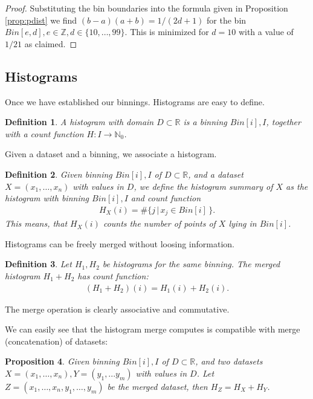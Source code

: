 \documentclass{article}
\theoremstyle{plain}
\newtheorem{definition}{Definition}[section]
\newtheorem{proposition}[definition]{Proposition}
\theoremstyle{remark}
\newcommand{\IN}{\mathbb{N}}
\newcommand{\IR}{\mathbb{R}}
\newcommand{\IZ}{\mathbb{Z}}
\newcommand{\ra}{\rightarrow}
\begin{document}
\begin{proof}
  Substituting the bin boundaries into the formula given in Proposition \ref{prop:pdist} we find
  $(b - a)(a + b) = 1/(2d + 1)$ for the bin $Bin[e,d], e \in \IZ, d \in \{ 10, \dots, 99 \}$.
  This is minimized for $d = 10$ with a value of $1/21$ as claimed.
\end{proof}

\subsection{Histograms}

Once we have established our binnings. Histograms are easy to define.

\begin{definition}\label{def:hist}
  A histogram with domain $D \subset \IR$ is a binning $Bin[i],I$, together with a count function $H: I \ra \IN_{0}$.
\end{definition}

Given a dataset and a binning, we associate a histogram.

\begin{definition}
  Given binning $Bin[i],I$ of $D \subset \IR$, and a dataset $X = (x_1,\dots,x_n)$ with values in
  $D$, we define the histogram summary of $X$ as the histogram with binning $Bin[i],I$ and count
  function
  \begin{align*}
    H_X(i) = \# \{ j \, | \, x_j \in Bin[i] \, \}.
  \end{align*}
  This means, that $H_X(i)$ counts the number of points of $X$ lying in $Bin[i]$.
\end{definition}

Histograms can be freely merged without loosing information.

\begin{definition}
  Let $H_1, H_2$ be histograms for the same binning. The merged histogram $H_1 + H_2$ has count function:
  \begin{align*}
    (H_1+H_2)(i) = H_1(i) + H_2(i).
  \end{align*}
\end{definition}
The merge operation is clearly associative and commutative.

We can easily see that the histogram merge computes is compatible with merge (concatenation) of datasets:
\begin{proposition}
  Given binning $Bin[i],I$ of $D \subset \IR$, and two datasets $X = (x_1,\dots,x_n),Y=(y_1,...y_m)$ with
  values in $D$. Let $Z=(x_1, \dots, x_n, y_1, \dots, y_m)$ be the merged dataset, then $H_Z = H_X + H_Y$.
\end{proposition}
\end{document}
